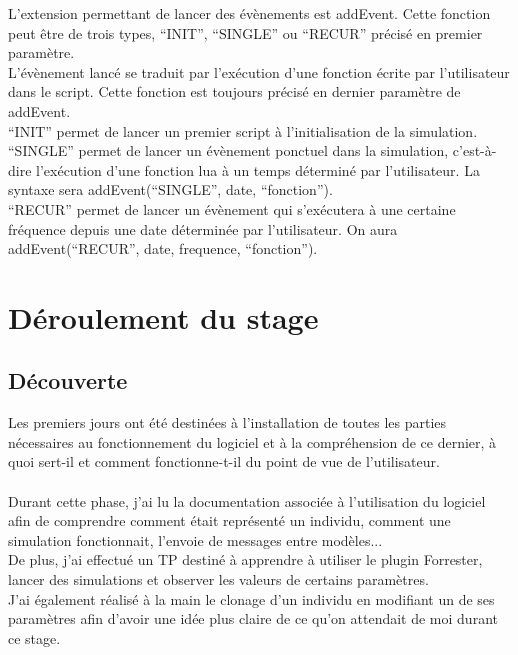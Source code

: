 L'extension permettant de lancer des évènements est addEvent. Cette fonction peut être de trois types, ``INIT'', ``SINGLE'' ou ``RECUR'' précisé en premier paramètre. \\
L'évènement lancé se traduit par l'exécution d'une fonction écrite par l'utilisateur dans le script. Cette fonction est toujours précisé en dernier paramètre de addEvent.\\
``INIT'' permet de lancer un premier script à l'initialisation de la simulation.\\
``SINGLE'' permet de lancer un évènement ponctuel dans la simulation, c'est-à-dire l'exécution d'une fonction lua à un temps déterminé par l'utilisateur. La syntaxe sera addEvent(``SINGLE'', date, ``fonction'').\\
``RECUR'' permet de lancer un évènement qui s'exécutera à une certaine fréquence depuis une date déterminée par l'utilisateur. On aura addEvent(``RECUR'', date, frequence, ``fonction'').

\section{Déroulement du stage}
\subsection{Découverte}
Les premiers jours ont été destinées à l'installation de toutes les parties nécessaires au fonctionnement du logiciel et à la compréhension de ce dernier, à quoi sert-il et comment fonctionne-t-il du point de vue de l'utilisateur.\\
\\
Durant cette phase, j'ai lu la documentation associée à l'utilisation du logiciel afin de comprendre comment était représenté un individu, comment une simulation fonctionnait, l'envoie de messages entre modèles...\\
De plus, j'ai effectué un TP destiné à apprendre à utiliser le plugin Forrester, lancer des simulations et observer les valeurs de certains paramètres.\\
J'ai également réalisé à la main le clonage d'un individu en modifiant un de ses paramètres afin d'avoir une idée plus claire de ce qu'on attendait de moi durant ce stage.

